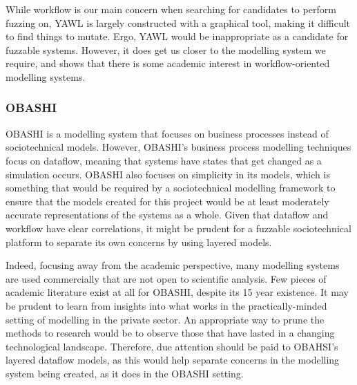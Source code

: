 \documentclass[11pt, twocolumn]{article}
\begin{document}
While workflow is our main concern when searching for candidates to perform fuzzing on, YAWL is largely constructed with a graphical tool, making it difficult to find things to mutate. Ergo, YAWL would be inappropriate as a candidate for fuzzable systems. However, it does get us closer to the modelling system we require, and shows that there is some academic interest in workflow-oriented modelling systems. \par

\subsubsection{OBASHI}
OBASHI\cite{ObashiMethodology} is a modelling system that focuses on business processes instead of sociotechnical models. However, OBASHI's business process modelling techniques focus on dataflow, meaning that systems have states that get changed as a simulation occurs. OBASHI also focuses on simplicity in its models, which is something that would be required by a sociotechnical modelling framework to ensure that the models created for this project would be at least moderately accurate representations of the systems as a whole. Given that dataflow and workflow have clear correlations, it might be prudent for a fuzzable sociotechnical platform to separate its own concerns by using layered models. \par 

Indeed, focusing away from the academic perspective, many modelling systems are used commercially that are not open to scientific analysis. Few pieces of academic literature exist at all for OBASHI, despite its 15 year existence. It may be prudent to learn from insights into what works in the practically-minded setting of modelling in the private sector. An appropriate way to prune the methods to research would be to observe those that have lasted in a changing technological landscape. Therefore, due attention should be paid to OBAHSI's layered dataflow models, as this would help separate concerns in the modelling system being created, as it does in the OBASHI setting. \par

\end{document}
